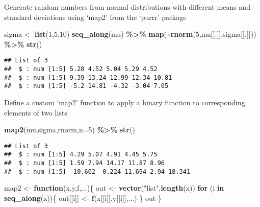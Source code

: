 \documentclass[
]{article}
\newenvironment{Shaded}{\begin{snugshade}}{\end{snugshade}}
\newcommand{\AttributeTok}[1]{\textcolor[rgb]{0.13,0.29,0.53}{#1}}
\newcommand{\ControlFlowTok}[1]{\textcolor[rgb]{0.13,0.29,0.53}{\textbf{#1}}}
\newcommand{\DecValTok}[1]{\textcolor[rgb]{0.00,0.00,0.81}{#1}}
\newcommand{\FunctionTok}[1]{\textcolor[rgb]{0.13,0.29,0.53}{\textbf{#1}}}
\newcommand{\NormalTok}[1]{#1}
\newcommand{\OtherTok}[1]{\textcolor[rgb]{0.56,0.35,0.01}{#1}}
\newcommand{\SpecialCharTok}[1]{\textcolor[rgb]{0.81,0.36,0.00}{\textbf{#1}}}
\newcommand{\StringTok}[1]{\textcolor[rgb]{0.31,0.60,0.02}{#1}}
\begin{document}
Generate random numbers from normal distributions with different means
and standard deviations using `map2' from the `purrr' package

\begin{Shaded}
\begin{Highlighting}[]
\NormalTok{sigma }\OtherTok{\textless{}{-}} \FunctionTok{list}\NormalTok{(}\DecValTok{1}\NormalTok{,}\DecValTok{5}\NormalTok{,}\DecValTok{10}\NormalTok{)}
\FunctionTok{seq\_along}\NormalTok{(mu) }\SpecialCharTok{\%\textgreater{}\%} 
  \FunctionTok{map}\NormalTok{(}\SpecialCharTok{\textasciitilde{}}\FunctionTok{rnorm}\NormalTok{(}\DecValTok{5}\NormalTok{,mu[[.]],sigma[[.]])) }\SpecialCharTok{\%\textgreater{}\%} 
  \FunctionTok{str}\NormalTok{()}
\end{Highlighting}
\end{Shaded}

\begin{verbatim}
## List of 3
##  $ : num [1:5] 5.28 4.52 5.04 5.29 4.52
##  $ : num [1:5] 9.39 13.24 12.99 12.34 10.81
##  $ : num [1:5] -5.2 14.81 -4.32 -3.04 7.05
\end{verbatim}

Define a custom `map2' function to apply a binary function to
corresponding elements of two lists

\begin{Shaded}
\begin{Highlighting}[]
\FunctionTok{map2}\NormalTok{(mu,sigma,rnorm,}\AttributeTok{n=}\DecValTok{5}\NormalTok{) }\SpecialCharTok{\%\textgreater{}\%} \FunctionTok{str}\NormalTok{()}
\end{Highlighting}
\end{Shaded}

\begin{verbatim}
## List of 3
##  $ : num [1:5] 4.29 5.07 4.91 4.45 5.75
##  $ : num [1:5] 1.59 7.94 14.17 11.87 8.96
##  $ : num [1:5] -10.602 -0.224 11.694 2.94 18.341
\end{verbatim}

\begin{Shaded}
\begin{Highlighting}[]
\NormalTok{map2 }\OtherTok{\textless{}{-}} \ControlFlowTok{function}\NormalTok{(x,y,f,...)\{}
\NormalTok{  out }\OtherTok{\textless{}{-}} \FunctionTok{vector}\NormalTok{(}\StringTok{"list"}\NormalTok{,}\FunctionTok{length}\NormalTok{(x))}
  \ControlFlowTok{for}\NormalTok{ (i }\ControlFlowTok{in} \FunctionTok{seq\_along}\NormalTok{(x))\{}
\NormalTok{    out[[i]] }\OtherTok{\textless{}{-}} \FunctionTok{f}\NormalTok{(x[[i]],y[[i]],...)}
\NormalTok{  \}}
\NormalTok{  out}
\NormalTok{\}}
\end{Highlighting}
\end{Shaded}
\end{document}
